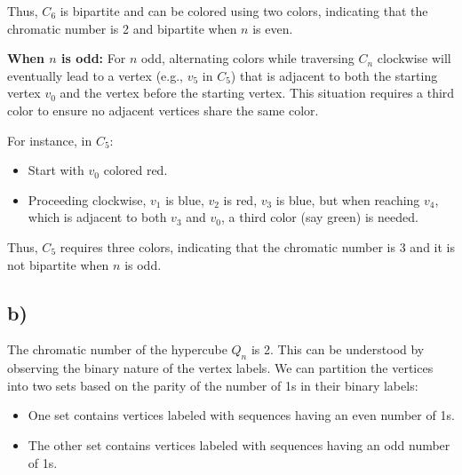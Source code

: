 \documentclass[12pt]{article}
\begin{document}
Thus, \( C_6 \) is bipartite and can be colored using two colors, indicating that the chromatic number is 2 and bipartite when \( n \) is even.

\textbf{When \( n \) is odd:}
For \( n \) odd, alternating colors while traversing \( C_n \) clockwise will eventually lead to a vertex (e.g., \( v_5 \) in \( C_5 \)) that is adjacent to both the starting vertex \( v_0 \) and the vertex before the starting vertex. This situation requires a third color to ensure no adjacent vertices share the same color.

For instance, in \( C_5 \):

\begin{itemize}
    \item Start with \( v_0 \) colored red.
    \item Proceeding clockwise, \( v_1 \) is blue, \( v_2 \) is red, \( v_3 \) is blue, but when reaching \( v_4 \), which is adjacent to both \( v_3 \) and \( v_0 \), a third color (say green) is needed.
\end{itemize}


Thus, \( C_5 \) requires three colors, indicating that the chromatic number is 3 and it is not bipartite when \( n \) is odd.


\subsection*{b)}

The chromatic number of the hypercube \( Q_n \) is 2. This can be understood by observing the binary nature of the vertex labels. We can partition the vertices into two sets based on the parity of the number of 1s in their binary labels:

\begin{itemize}
    \item One set contains vertices labeled with sequences having an even number of 1s.
    \item The other set contains vertices labeled with sequences having an odd number of 1s.
\end{itemize}
\end{document}
